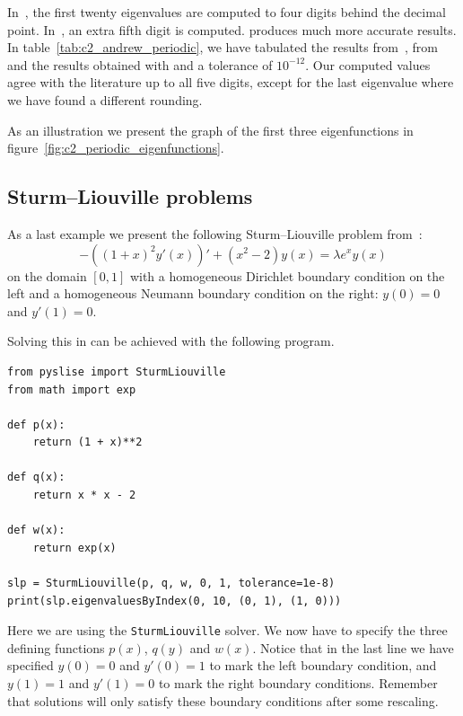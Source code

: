 In~\cite{andrew_correction_1989}, the first twenty eigenvalues are computed to four digits behind the decimal point. In~\cite{vandenberghe_modified_1995}, an extra fifth digit is computed.  produces much more accurate results. In table~\ref{tab:c2_andrew_periodic}, we have tabulated the results from~\cite{andrew_correction_1989}, from~\cite{vandenberghe_modified_1995} and the results obtained with \pyslise{} and a tolerance of $10^{-12}$. Our computed values agree with the literature up to all five digits, except for the last eigenvalue where we have found a different rounding.

As an illustration we present the graph of the first three eigenfunctions in figure~\ref{fig:c2_periodic_eigenfunctions}.


\subsection{Sturm--Liouville problems}\label{sec:c2_experiment_sturm_liouville}

As a last example we present the following Sturm--Liouville problem from~\cite{siedlecki_sturmliouville_2016}:
$$
    -\left((1+x)^2 y'(x)\right)' + \left(x^2 - 2\right) y(x) = \lambda e^x y(x)
$$
on the domain $[0, 1]$ with a homogeneous Dirichlet boundary condition on the left and a homogeneous Neumann boundary condition on the right: $y(0) = 0$ and $y'(1) = 0$.

Solving this in \pyslise{} can be achieved with the following program.
\begin{verbatim}
from pyslise import SturmLiouville
from math import exp

def p(x):
    return (1 + x)**2

def q(x):
    return x * x - 2

def w(x):
    return exp(x)
    
slp = SturmLiouville(p, q, w, 0, 1, tolerance=1e-8)
print(slp.eigenvaluesByIndex(0, 10, (0, 1), (1, 0)))
\end{verbatim}

Here we are using the \texttt{SturmLiouville} solver. We now have to specify the three defining functions $p(x)$, $q(y)$ and $w(x)$. Notice that in the last line we have specified $y(0) = 0$ and $y'(0) = 1$ to mark the left boundary condition, and $y(1) = 1$ and $y'(1) = 0$ to mark the right boundary conditions. Remember that solutions will only satisfy these boundary conditions after some rescaling.


